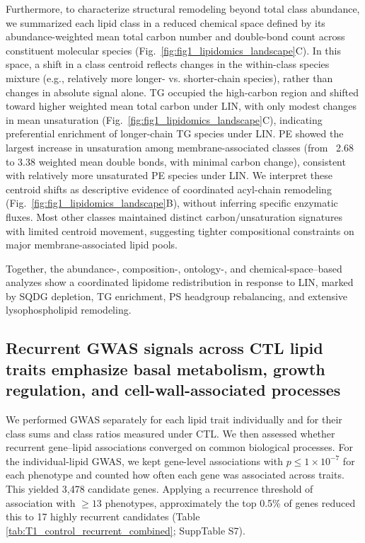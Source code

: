 \documentclass[9pt,twocolumn,twoside]{rilabRxiv}
\begin{document}
Furthermore, to characterize structural remodeling beyond total class abundance, we summarized each lipid class in a reduced chemical space defined by its abundance-weighted mean total carbon number and double-bond count across constituent molecular species (Fig.~\ref{fig:fig1_lipidomics_landscape}C). In this space, a shift in a class centroid reflects changes in the within-class species mixture (e.g., relatively more longer- vs. shorter-chain species), rather than changes in absolute signal alone. TG occupied the high-carbon region and shifted toward higher weighted mean total carbon under LIN, with only modest changes in mean unsaturation (Fig.~\ref{fig:fig1_lipidomics_landscape}C), indicating preferential enrichment of longer-chain TG species under LIN. PE showed the largest increase in unsaturation among membrane-associated classes (from ~2.68 to 3.38 weighted mean double bonds, with minimal carbon change), consistent with relatively more unsaturated PE species under LIN. We interpret these centroid shifts as descriptive evidence of coordinated acyl-chain remodeling (Fig.~\ref{fig:fig1_lipidomics_landscape}B), without inferring specific enzymatic fluxes. Most other classes maintained distinct carbon/unsaturation signatures with limited centroid movement, suggesting tighter compositional constraints on major membrane-associated lipid pools.

Together, the abundance-, composition-, ontology-, and chemical-space–based analyzes show a coordinated lipidome redistribution in response to LIN, marked by SQDG depletion, TG enrichment, PS headgroup rebalancing, and extensive lysophospholipid remodeling.

\subsection*{Recurrent GWAS signals across CTL lipid traits emphasize basal metabolism, growth regulation, and cell-wall-associated processes}

We performed GWAS separately for each lipid trait individually and for their class sums and class ratios measured under CTL. We then assessed whether recurrent gene--lipid associations converged on common biological processes. For the individual-lipid GWAS, we kept gene-level associations with $p \le 1 \times 10^{-7}$ for each phenotype and counted how often each gene was associated across traits. This yielded 3,478 candidate genes. Applying a recurrence threshold of association with $\geq 13$ phenotypes, approximately the top 0.5\% of genes reduced this to 17 highly recurrent candidates (Table \ref{tab:T1_control_recurrent_combined}; SuppTable S7).
\end{document}
